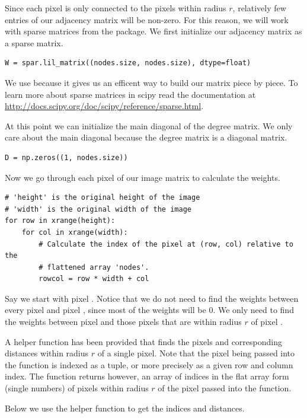 Since each pixel is only connected to the pixels within radius $r$, relatively few entries of our adjacency matrix will be non-zero. For this reason, we will work with sparse matrices from the  package. We first initialize our adjacency matrix as a sparse matrix.

\begin{lstlisting}
W = spar.lil_matrix((nodes.size, nodes.size), dtype=float)
\end{lstlisting}
We use  because it gives us an efficent way to build our matrix piece by piece. To learn more about sparse matrices in scipy read the documentation at \url{http://docs.scipy.org/doc/scipy/reference/sparse.html}.

At this point we can initialize the main diagonal of the degree matrix. We only care about the main diagonal because the degree matrix is a diagonal matrix.
\begin{lstlisting}
D = np.zeros((1, nodes.size))
\end{lstlisting}
Now we go through each pixel of our image matrix to calculate the weights.

\begin{lstlisting}
# 'height' is the original height of the image
# 'width' is the original width of the image
for row in xrange(height):
    for col in xrange(width):
        # Calculate the index of the pixel at (row, col) relative to the
        # flattened array 'nodes'. 
        rowcol = row * width + col
\end{lstlisting}
Say we start with pixel . Notice that we do not need to find the weights between every pixel and pixel , since most of the weights will be 0. We only need to find the weights between pixel  and those pixels that are within radius $r$ of pixel . 

A helper function has been provided that finds the pixels and corresponding distances within radius $r$ of a single pixel. Note that the pixel being passed into the function is indexed as a tuple, or more precisely as a given row and column index. The function returns however, an array of indices in the flat array form (single numbers) of pixels within radius $r$ of the pixel passed into the function.

Below we use the helper function to get the indices and distances.

